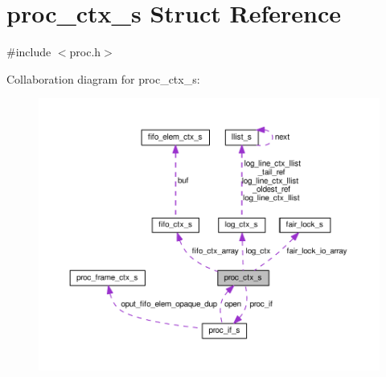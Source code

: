 \hypertarget{structproc__ctx__s}{}\section{proc\+\_\+ctx\+\_\+s Struct Reference}
\label{structproc__ctx__s}


{\ttfamily \#include $<$proc.\+h$>$}



Collaboration diagram for proc\+\_\+ctx\+\_\+s\+:\nopagebreak
\begin{figure}[H]
\begin{center}
\leavevmode
\includegraphics[width=350pt]{structproc__ctx__s__coll__graph}
\end{center}
\end{figure}

